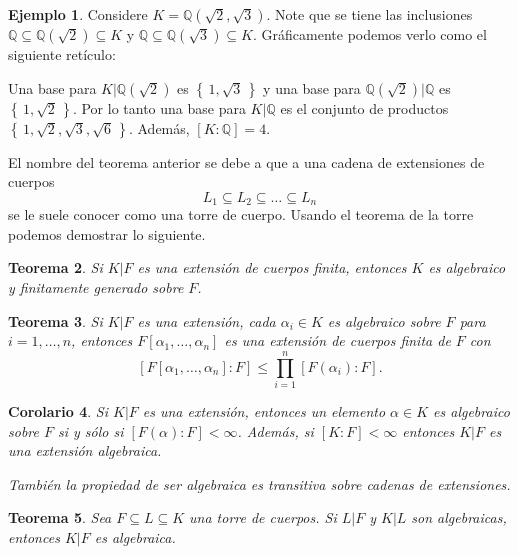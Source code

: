 \documentclass{amsbook}
\renewcommand{\.}{\cdot}
\renewcommand{\:}{\colon}               %
\newcommand{\bQ}{\mathbb{Q}}    %
\newcommand{\set}[1]{\left\{\,#1\,\right\}}    %
\newcommand{\al}{\alpha}                %
\theoremstyle{plain}
\newtheorem{Th}{Teorema}[section]   %
\newtheorem{Cor}[Th]{Corolario}        %
\theoremstyle{definition}
\newtheorem{Ex}[Th]{Ejemplo}           %
\theoremstyle{remark}
\numberwithin{equation}{section}
\begin{document}
\begin{Ex}
    Considere $K=\bQ(\sqrt{2},\sqrt{3})$. Note que se tiene las inclusiones 
    $\bQ\subseteq\bQ(\sqrt{2})\subseteq K$ y $\bQ\subseteq\bQ(\sqrt{3})\subseteq K$. Gráficamente podemos verlo como el siguiente retículo:
    \begin{center}
    \end{center}
    Una base para $K|\bQ(\sqrt{2})$ es $\set{1,\sqrt{3}}$ y una base para $\bQ(\sqrt{2})|\bQ$ es $\set{1,\sqrt{2}}$. Por lo tanto una base para $K|\bQ$ es el conjunto de productos $\set{1,\sqrt{2},\sqrt{3},\sqrt{6}}$. Además, $[K:\bQ]=4$.
\end{Ex}

El nombre del teorema anterior se debe a que a una cadena de extensiones de cuerpos 
$$L_1\subseteq L_2\subseteq\dots\subseteq L_n$$
 se le suele conocer como una torre de cuerpo. Usando el teorema de la torre podemos demostrar lo siguiente.

 \begin{Th}
     Si $K|F$ es una extensión de cuerpos finita, entonces $K$ es algebraico y finitamente generado sobre $F$.
 \end{Th}

 \begin{Th}
     Si $K|F$ es una extensión, cada $\al_i\in K$ es algebraico sobre $F$ para $i=1,\dots,n$, entonces $F[\al_1,\dots,\al_n]$ es una extensión de cuerpos finita de $F$ con
     $$[F[\al_1,\dots,\al_n]:F]\leq\prod_{i=1}^n[F(\al_i):F].$$
 \end{Th}

 \begin{Cor}
     Si $K|F$ es una extensión, entonces un elemento $\al\in K$ es algebraico sobre $F$ si y sólo si $[F(\al):F]<\infty$. Además, si $[K:F]<\infty$ entonces $K|F$ es una extensión algebraica.\par 
     También la propiedad de ser algebraica es transitiva sobre cadenas de extensiones.
 \end{Cor}

 \begin{Th}
     Sea $F\subseteq L\subseteq K$ una torre de cuerpos. Si $L|F$ y $K|L$ son algebraicas, entonces $K|F$ es algebraica.
 \end{Th}
\end{document}
